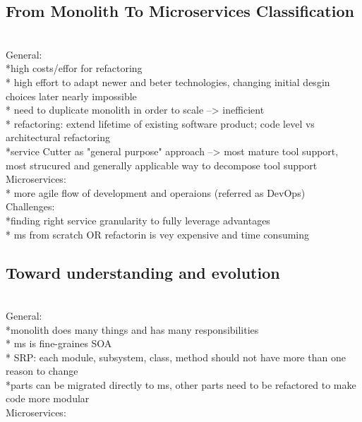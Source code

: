 \subsection{From Monolith To Microservices Classification}
\cite{ClassificationOfRefactoring} \\

General:\\
*high costs/effor for refactoring\\
* high effort to adapt newer and beter technologies, changing initial desgin choices later nearly impossible \\
* need to duplicate monolith in order to scale --> inefficient\\
* refactoring: extend lifetime of existing software product; code level vs architectural refactoring\\
*service Cutter as "general purpose" approach --> most mature tool support, most strucured and generally applicable way to decompose tool support\\


Microservices:\\
* more agile flow of development and operaions (referred as DevOps)\\


Challenges:\\
*finding right service granularity to fully leverage advantages\\
* ms from scratch OR refactorin is vey expensive and time consuming\\


\subsection{Toward understanding and evolution}
\cite{TowardsUnderstandingEvolution} \\

General:\\
*monolith  does many things and has many responsibilities \\
* ms is fine-graines SOA\\
* SRP: each module, subsystem, class, method should not have more than one reason to change\\
*parts can be migrated directly to ms, other parts need to be refactored to make code more modular\\

Microservices:\\




